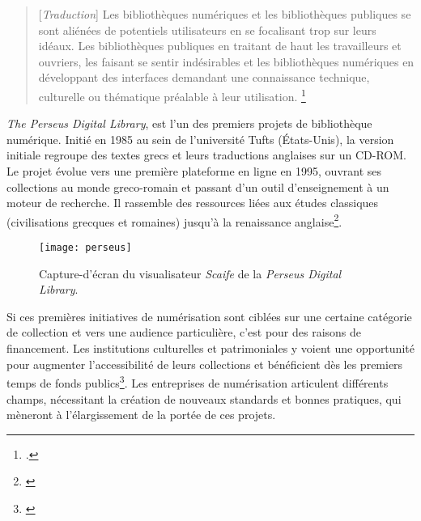 \begin{quotation}
[\textit{Traduction}]
Les bibliothèques numériques et les bibliothèques publiques se sont aliénées de potentiels utilisateurs en se focalisant trop sur leurs idéaux. Les bibliothèques publiques en traitant de haut les travailleurs et ouvriers, les faisant se sentir indésirables et les bibliothèques numériques en développant des interfaces demandant une connaissance technique, culturelle ou thématique préalable à leur utilisation.
\footnote{\cite[p.247]{jones_public_2017}.}
\end{quotation}

\textit{The Perseus Digital Library}, est l'un des premiers projets de bibliothèque numérique. Initié en 1985 au sein de l'université Tufts (États-Unis), la version initiale regroupe des textes grecs et leurs traductions anglaises sur un CD-ROM. Le projet évolue vers une première plateforme en ligne en 1995, ouvrant ses collections au monde greco-romain et passant d'un outil d'enseignement à un moteur de recherche. Il rassemble des ressources liées aux études classiques (civilisations grecques et romaines) jusqu'à la renaissance anglaise\footnote{\cite{dubis_web_2003}}.

\begin{figure}[H]%
\centering
\texttt{[image: perseus]}
\caption{Capture-d'écran du visualisateur \textit{Scaife} de la \textit{Perseus Digital Library}.}
\end{figure}

Si ces premières initiatives de numérisation sont ciblées sur une certaine catégorie de collection et vers une audience particulière, c'est pour des raisons de financement. Les institutions culturelles et patrimoniales y voient  une opportunité pour augmenter l'accessibilité de leurs collections et bénéficient dès les premiers temps de fonds publics\footnote{\cite[p.1]{coutts_stepping_2017}}. Les entreprises de numérisation articulent différents champs, nécessitant la création de nouveaux standards et bonnes pratiques, qui mèneront à l'élargissement de la portée de ces projets. 

